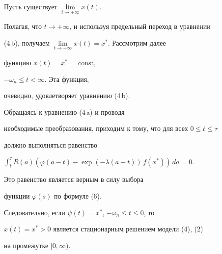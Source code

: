 \begin{pf}


Пусть существует $\lim\limits_{t\to+\infty} x(t)$.


Полагая, что $t \to+\infty$, и используя предельный переход в уравнении


(4\,b), получаем $\lim\limits_{t\to+\infty} x(t)=x^{*}$. Рассмотрим далее


функцию $x(t)=x^{*}=\,\text{const}$,


$- \omega_{n} \leq t < \infty$. Эта функция,


очевидно, удовлетворяет уравнению (4\,b).


Обращаясь к уравнению (4\,a) и проводя


необходимые преобразования, приходим к тому, что для всех $0\le t \le\tau$


должно выполняться равенство


$\int_{t}^{\tau} R(a)


(\varphi(a-t) - \exp(- \lambda (a - t))\, f(x^{*}))\, da=0.$


Это равенство является верным в силу выбора


функции $\varphi(s)$ по формуле (6).


Следовательно, если $\psi(t)=x^{*}$, $- \omega_{n} \leq t \leq 0$, то


$x(t)=x^{*} > 0$ является стационарным решением модели (4), (2)


на промежутке $[0, \infty)$.


\end{pf}





